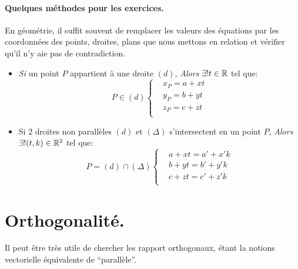 \documentclass[12pt]{article}
\begin{document}
\paragraph{Quelques méthodes pour les exercices.}
En géométrie, il suffit souvent de remplacer les valeurs des équations
par les coordonnées des points, droites, plans que nous mettons en relation
et vérifier qu'il n'y aie pas de contradiction.
\begin{itemize}
    \item \textit{Si} un point $P$ appartient à une droite $(d)$, 
        \textit{Alors} $\exists! t \in \mathbb{R}$ tel que: $$
        P \in (d) \begin{cases}
            & x_P = a + xt \\ 
            & y_P = b + yt \\
            & z_P = c + zt \\
        \end{cases}
    $$ 
    \item Si 2 droites non parallèles $(d)$ et $(\Delta)$ s'intersectent en un point $P$,
        \textit{Alors} $\exists!(t, k) \in \mathbb{R}^2$ tel que: $$
        P = (d) \cap (\Delta) \begin{cases}
            & a + xt = a' + x'k \\
            & b + yt = b' + y'k \\
            & c + zt = c' + z'k \\
        \end{cases}
        $$
\end{itemize}   

\section{Orthogonalité.}
Il peut être très utile de chercher les rapport orthogonaux, 
étant la notions vectorielle équivalente de \enquote{parallèle}.
\end{document}
